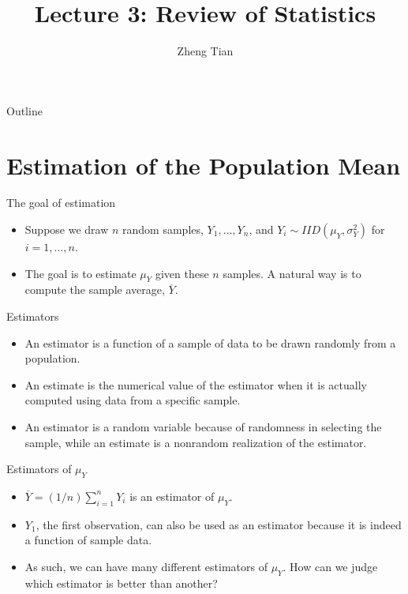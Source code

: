 \documentclass[presentation]{beamer}
\author{Zheng Tian}
\date{}
\title{Lecture 3: Review of Statistics}
\begin{document}
\maketitle
\begin{frame}{Outline}
\setcounter{tocdepth}{1}
\tableofcontents
\end{frame}



\section{Estimation of the Population Mean}
\label{sec:org5a69501}

\begin{frame}[label={sec:org37a7730}]{The goal of estimation}
\begin{itemize}
\item Suppose we draw \(n\) random samples, \(Y_1, \ldots, Y_n\), and 
\(Y_i \sim IID(\mu_Y, \sigma^2_Y)\) for \(i=1, \ldots, n\).

\item The goal is to estimate \(\mu_Y\) given these \(n\) samples. A natural
way is to compute the sample average, \(\overline{Y}\).
\end{itemize}
\end{frame}

\begin{frame}[label={sec:orgd6b3b12}]{Estimators}
\begin{itemize}
\item An \alert{estimator} is a function of a sample of data to be drawn randomly
from a population.

\item An \alert{estimate} is the numerical value of the
estimator when it is actually computed using data from a specific
sample.

\item An estimator is a random variable because of randomness in
selecting the sample, while an estimate is a nonrandom realization of
the estimator.
\end{itemize}
\end{frame}

\begin{frame}[label={sec:orgb6c0231}]{Estimators of \(\mu_Y\)}
\begin{itemize}
\item \(\overline{Y} = (1/n)\sum_{i=1}^n Y_i\)  is an estimator of
\(\mu_Y\).

\item \(Y_1\), the first observation, can also be used as an
estimator because it is indeed a function of sample data.

\item As such, we can have many different estimators of \(\mu_Y\). How can
we judge which estimator is better than another?
\end{itemize}
\end{frame}
\end{document}
